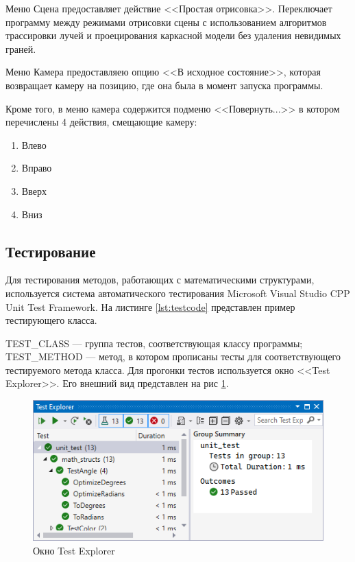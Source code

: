 Меню Сцена предоставляет действие <<Простая отрисовка>>. Переключает программу между режимами отрисовки сцены с использованием алгоритмов трассировки лучей и проецирования каркасной модели без удаления невидимых граней.

Меню Камера предоставляею опцию <<В исходное состояние>>, которая возвращает камеру на позицию, где она была в момент запуска программы.

Кроме того, в меню камера содержится подменю <<Повернуть...>> в котором перечислены 4 действия, смещающие камеру:
\begin{enumerate}
	\item Влево
	\item Вправо
	\item Вверх
	\item Вниз
\end{enumerate}

\subsection{Тестирование}
Для тестирования методов, работающих с математическими структурами, используется система автоматического тестирования Microsoft Visual Studio CPP Unit Test Framework. На листинге \ref{lst:testcode} представлен пример тестирующего класса.

TEST\_CLASS --- группа тестов, соответствующая классу программы; TEST\_METHOD --- метод, в котором прописаны тесты для соответствующего тестируемого метода класса. Для прогонки тестов используется окно <<Test Explorer>>. Его внешний вид представлен на рис \ref{fig:test_explorer}.

\begin{figure}[ht]
	\centering
	\includegraphics[width=1\linewidth]{img/test_explorer}
	\caption{Окно Test Explorer}
	\label{fig:test_explorer}
\end{figure}
\clearpage

